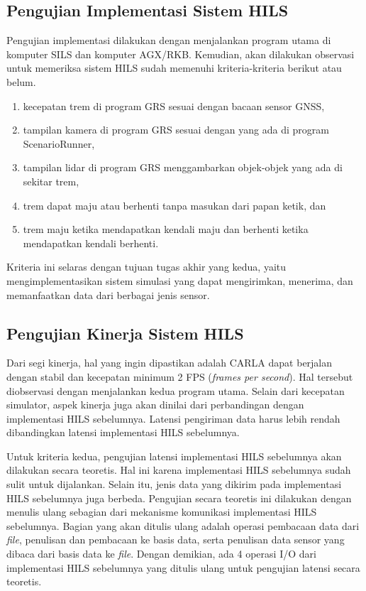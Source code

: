\subsection{Pengujian Implementasi Sistem HILS}

Pengujian implementasi dilakukan dengan menjalankan program utama di komputer
SILS dan komputer AGX/RKB. Kemudian, akan dilakukan observasi untuk memeriksa
sistem HILS sudah memenuhi kriteria-kriteria berikut atau belum.

\begin{enumerate}
	\item kecepatan trem di program GRS sesuai dengan bacaan sensor GNSS,
	\item tampilan kamera di program GRS sesuai dengan yang ada di program
		ScenarioRunner,
	\item tampilan lidar di program GRS menggambarkan objek-objek yang ada di
		sekitar trem,
	\item trem dapat maju atau berhenti tanpa masukan dari papan ketik, dan
	\item trem maju ketika mendapatkan kendali maju dan berhenti ketika
		mendapatkan kendali berhenti.
\end{enumerate}

Kriteria ini selaras dengan tujuan tugas akhir yang kedua, yaitu
mengimplementasikan sistem simulasi yang dapat mengirimkan, menerima, dan
memanfaatkan data dari berbagai jenis sensor.

\subsection{Pengujian Kinerja Sistem HILS}

Dari segi kinerja, hal yang ingin dipastikan adalah CARLA dapat berjalan dengan
stabil dan kecepatan minimum 2 FPS (\textit{frames per second}). Hal tersebut
diobservasi dengan menjalankan kedua program utama. Selain dari kecepatan
simulator, aspek kinerja juga akan dinilai dari perbandingan dengan implementasi
HILS sebelumnya. Latensi pengiriman data harus lebih rendah dibandingkan latensi
implementasi HILS sebelumnya.

Untuk kriteria kedua, pengujian latensi implementasi HILS sebelumnya akan
dilakukan secara teoretis. Hal ini karena implementasi HILS sebelumnya sudah
sulit untuk dijalankan. Selain itu, jenis data yang dikirim pada implementasi
HILS sebelumnya juga berbeda. Pengujian secara teoretis ini dilakukan dengan
menulis ulang sebagian dari mekanisme komunikasi implementasi HILS sebelumnya.
Bagian yang akan ditulis ulang adalah operasi pembacaan data dari \textit{file},
penulisan dan pembacaan ke basis data, serta penulisan data sensor yang dibaca
dari basis data ke \textit{file}. Dengan demikian, ada 4 operasi I/O dari
implementasi HILS sebelumnya yang ditulis ulang untuk pengujian latensi secara
teoretis.


